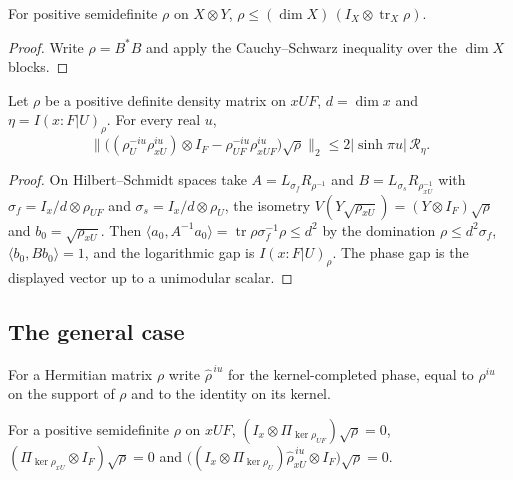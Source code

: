 \begin{lemma}
    \label{lem:marginal_domination}
    \leanok
    For positive semidefinite $\rho$ on $X\otimes Y$,
    $\rho\le(\dim X)\,(I_X\otimes\operatorname{tr}_X\rho)$.
\end{lemma}

\begin{proof}\leanok
    Write $\rho=B^*B$ and apply the Cauchy--Schwarz inequality over the
    $\dim X$ blocks.
\end{proof}

\begin{theorem}
    \label{thm:marginal_phase_faithful}
    \leanok
    Let $\rho$ be a positive definite density matrix on $xUF$, $d=\dim x$ and
    $\eta=I(x:F|U)_\rho$. For every real $u$,
    \[
      \bigl\lVert\bigl((\rho_U^{-iu}\rho_{xU}^{iu})\otimes I_F
        -\rho_{UF}^{-iu}\rho_{xUF}^{iu}\bigr)\sqrt\rho\bigr\rVert_2
      \le2|\sinh\pi u|\,\mathcal R_\eta .
    \]
\end{theorem}

\begin{proof}\leanok
    On Hilbert--Schmidt spaces take $A=L_{\sigma_f}R_{\rho^{-1}}$ and
    $B=L_{\sigma_s}R_{\rho_{xU}^{-1}}$ with $\sigma_f=I_x/d\otimes\rho_{UF}$ and
    $\sigma_s=I_x/d\otimes\rho_U$, the isometry
    $V(Y\sqrt{\rho_{xU}})=(Y\otimes I_F)\sqrt\rho$ and $b_0=\sqrt{\rho_{xU}}$.
    Then $\langle a_0,A^{-1}a_0\rangle=\operatorname{tr}\rho\sigma_f^{-1}\rho\le d^2$
    by the domination $\rho\le d^2\sigma_f$, $\langle b_0,Bb_0\rangle=1$, and
    the logarithmic gap is $I(x:F|U)_\rho$. The phase gap is the displayed
    vector up to a unimodular scalar.
\end{proof}

\subsection{The general case}

For a Hermitian matrix $\rho$ write $\widehat\rho^{\,iu}$ for the
kernel-completed phase, equal to $\rho^{iu}$ on the support of $\rho$ and to
the identity on its kernel.

\begin{lemma}
    \label{lem:marginal_phase_support}
    \leanok
    For a positive semidefinite $\rho$ on $xUF$,
    $(I_x\otimes\Pi_{\ker\rho_{UF}})\sqrt\rho=0$,
    $(\Pi_{\ker\rho_{xU}}\otimes I_F)\sqrt\rho=0$ and
    $\bigl((I_x\otimes\Pi_{\ker\rho_U})\widehat\rho_{xU}^{\,iu}\otimes I_F\bigr)
    \sqrt\rho=0$.
\end{lemma}

